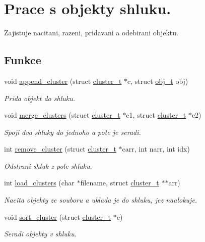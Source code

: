 \hypertarget{group__Objekty}{}\section{Prace s objekty shluku.}
\label{group__Objekty}


Zajistuje nacitani, razeni, pridavani a odebirani objektu.  


\subsection*{Funkce}
\begin{DoxyCompactItemize}
\item 
void \hyperlink{group__Objekty_gab6269b64b2c7f4842a51c58b2d86a2e5}{append\+\_\+cluster} (struct \hyperlink{structcluster__t}{cluster\+\_\+t} $\ast$c, struct \hyperlink{structobj__t}{obj\+\_\+t} obj)
\begin{DoxyCompactList}\small\item\em Prida objekt do shluku. \end{DoxyCompactList}\item 
void \hyperlink{group__Objekty_gac39a25fdec1f4952ec92ee5407893158}{merge\+\_\+clusters} (struct \hyperlink{structcluster__t}{cluster\+\_\+t} $\ast$c1, struct \hyperlink{structcluster__t}{cluster\+\_\+t} $\ast$c2)
\begin{DoxyCompactList}\small\item\em Spoji dva shluky do jednoho a pote je seradi. \end{DoxyCompactList}\item 
int \hyperlink{group__Objekty_gaf73744f9128e4605127b40932a730a48}{remove\+\_\+cluster} (struct \hyperlink{structcluster__t}{cluster\+\_\+t} $\ast$carr, int narr, int idx)
\begin{DoxyCompactList}\small\item\em Odstrani shluk z pole shluku. \end{DoxyCompactList}\item 
int \hyperlink{group__Objekty_ga9d928923d43120cb53ddff210a087061}{load\+\_\+clusters} (char $\ast$filename, struct \hyperlink{structcluster__t}{cluster\+\_\+t} $\ast$$\ast$arr)
\begin{DoxyCompactList}\small\item\em Nacita objekty ze souboru a uklada je do shluku, jez naalokuje. \end{DoxyCompactList}\item 
void \hyperlink{group__Objekty_ga12718af9e3e31b61bf703ec260e22450}{sort\+\_\+cluster} (struct \hyperlink{structcluster__t}{cluster\+\_\+t} $\ast$c)
\begin{DoxyCompactList}\small\item\em Seradi objekty v shluku. \end{DoxyCompactList}\end{DoxyCompactItemize}


